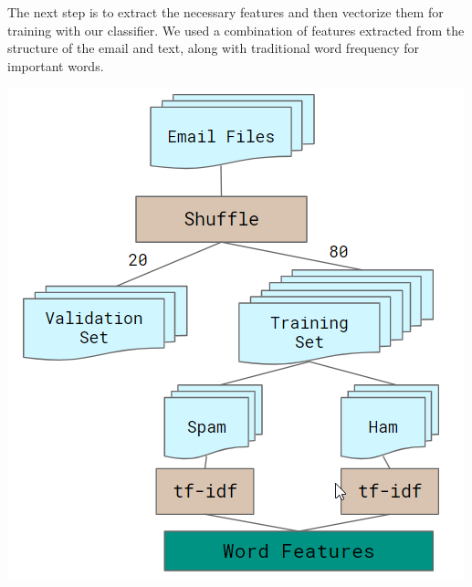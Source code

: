 \documentclass[12pt]{article}
\newenvironment{Figure}
  {\par\medskip\noindent\minipage{\linewidth}}
  {\endminipage\par\medskip}
\begin{document}
\begin{multicols}{2}
            The next step is to extract the necessary features and then vectorize
            them for training with our classifier. We used a combination of features
            extracted from the structure of the email and text, along with traditional
            word frequency for important words.
            
            \begin{Figure}
                \centering
                \includegraphics[width=\linewidth]{figures/extract.png}
                \label{fig:extrac}
            \end{Figure}
            

\end{multicols}
\end{document}
